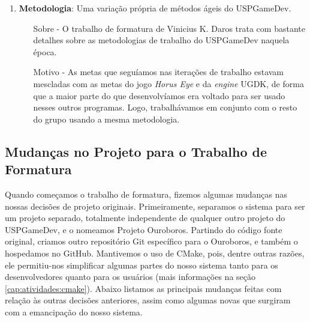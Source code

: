 \begin{enumerate}
    \item \textbf{Metodologia}: Uma variação própria de métodos ágeis do USPGameDev.
      \begin{itemize}
        \item[Sobre -] O trabalho de formatura de Vinicius K. Daros
          \cite{scrum:00} trata com bastante detalhes sobre as metodologias
          de trabalho do USPGameDev naquela época.
        \item[Motivo -] As metas que seguíamos nas iterações de trabalho
          estavam mescladas com as metas do jogo \textit{Horus Eye} e da
          \textit{engine} UGDK, de forma que a maior parte do que
          desenvolvíamos era voltado para ser usado nesses outros
          programas. Logo, trabalhávamos em conjunto com o resto do
          grupo usando a mesma metodologia.
      \end{itemize}

  \end{enumerate}

  \subsection{Mudanças no Projeto para o Trabalho de Formatura}
  Quando começamos o trabalho de formatura, fizemos algumas mudanças nas nossas
  decisões de projeto originais. Primeiramente, separamos o sistema para ser um
  projeto separado, totalmente independente de qualquer outro projeto do
  USPGameDev, e o nomeamos Projeto Ouroboros. Partindo do código fonte
  original, criamos outro repositório Git específico para o Ouroboros\footnotemark{},
  e também  o hospedamos no GitHub. Mantivemos o uso de CMake, pois, dentre outras
  razões, ele permitiu-nos simplificar algumas partes do nosso sistema tanto para os
  desenvolvedores quanto para os usuários (mais informações na seção
  \ref{cap:atividades:cmake}). Abaixo listamos as principais mudanças feitas
  com relação às outras decisões anteriores, assim como algumas novas que
  surgiram com a emancipação do nosso sistema.

  
